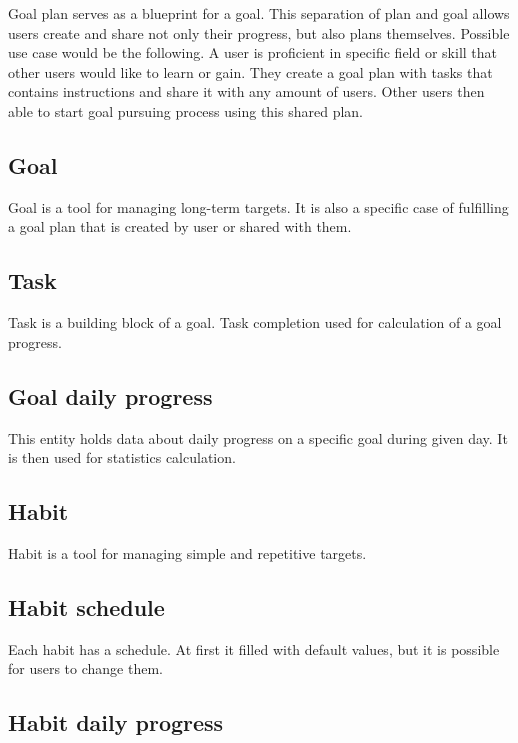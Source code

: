 Goal plan serves as a blueprint for a goal.
This separation of plan and goal allows users create and share not only their progress, but also plans themselves.
Possible use case would be the following.
A user is proficient in specific field or skill that other users would like to learn or gain.
They create a goal plan with tasks that contains instructions and share it with any amount of users.
Other users then able to start goal pursuing process using this shared plan.

\subsection{Goal}\label{subsec:goal}

Goal is a tool for managing long-term targets.
It is also a specific case of fulfilling a goal plan that is created by user or shared with them.

\subsection{Task}\label{subsec:task}

Task is a building block of a goal.
Task completion used for calculation of a goal progress.

\subsection{Goal daily progress}\label{subsec:goal-daily-progess}

This entity holds data about daily progress on a specific goal during given day.
It is then used for statistics calculation.

\subsection{Habit}\label{subsec:habit}

Habit is a tool for managing simple and repetitive targets.

\subsection{Habit schedule}\label{subsec:habit-schedule}

Each habit has a schedule.
At first it filled with default values, but it is possible for users to change them.

\subsection{Habit daily progress}\label{subsec:habit-daily-progress}

